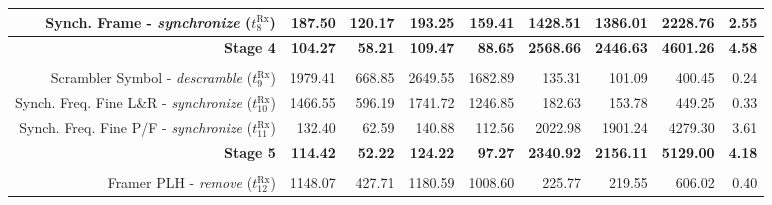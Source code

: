 \begin{table}[htp]
{{\begin{tabular}{r | r r r r  | r r r | r}
    \rowcolor{Paired-7!15}
                     Synch. Frame -   \emph{synchronize} ($t^\text{Rx}_{8}$)  &          187.50  &           120.17  &           193.25  &                                 159.41  &          1428.51  &          1386.01  &          2228.76  &          2.55  \\ \hline
                                                             \textbf{Stage 4} &  \textbf{104.27} &    \textbf{58.21} &   \textbf{109.47} &                          \textbf{88.65} &  \textbf{2568.66} &  \textbf{2446.63} &  \textbf{4601.26} &  \textbf{4.58} \\ %
                                                                              &                  &                   &                   &                                         &                   &                   &                   &                \\
                 Scrambler Symbol -    \emph{descramble} ($t^\text{Rx}_{9}$)  &         1979.41  &           668.85  &          2649.55  &                                 1682.89 &           135.31  &           101.09  &           400.45  &          0.24  \\
    \rowcolor{Paired-7!15}
           Synch. Freq. Fine L\&R -   \emph{synchronize} ($t^\text{Rx}_{10}$) &         1466.55  &           596.19  &          1741.72  &                                 1246.85 &           182.63  &           153.78  &           449.25  &          0.33  \\
            Synch. Freq. Fine P/F -   \emph{synchronize} ($t^\text{Rx}_{11}$) &          132.40  &            62.59  &           140.88  &                                  112.56 &          2022.98  &          1901.24  &          4279.30  &          3.61  \\ \hline
                                                             \textbf{Stage 5} &  \textbf{114.42} &    \textbf{52.22} &   \textbf{124.22} &                          \textbf{97.27} &  \textbf{2340.92} &  \textbf{2156.11} &  \textbf{5129.00} &  \textbf{4.18} \\ %
                                                                              &                  &                   &                   &                                         &                   &                   &                   &                \\
                       Framer PLH -        \emph{remove} ($t^\text{Rx}_{12}$) &         1148.07  &           427.71  &          1180.59  &                                1008.60  &           225.77  &           219.55  &           606.02  &          0.40  \\

\end{tabular}}}
\end{table}

